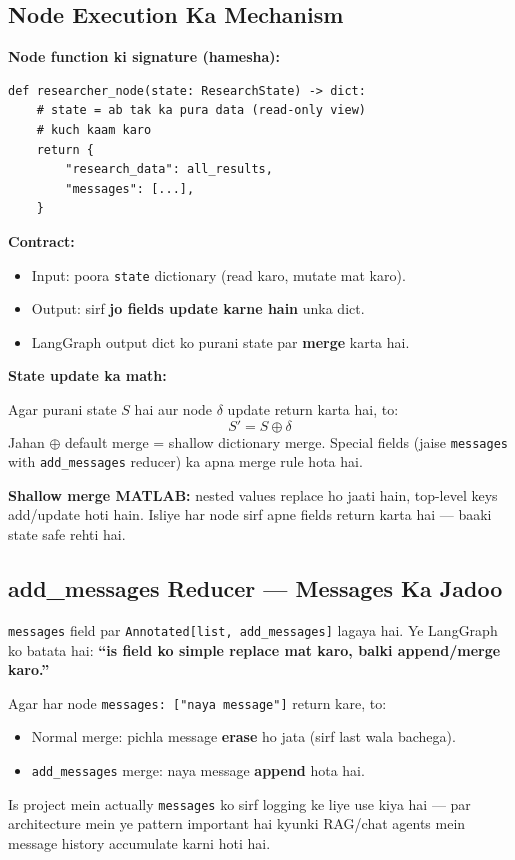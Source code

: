\subsection{Node Execution Ka Mechanism}

\begin{codestorybox}
\textbf{Node function ki signature (hamesha):}

\begin{lstlisting}[style=pythonstyle, caption={Ek node ka contract}]
def researcher_node(state: ResearchState) -> dict:
    # state = ab tak ka pura data (read-only view)
    # kuch kaam karo
    return {
        "research_data": all_results,
        "messages": [...],
    }
\end{lstlisting}

\textbf{Contract:}
\begin{itemize}
\item Input: poora \texttt{state} dictionary (read karo, mutate mat karo).
\item Output: sirf \textbf{jo fields update karne hain} unka dict.
\item LangGraph output dict ko purani state par \textbf{merge} karta hai.
\end{itemize}
\end{codestorybox}

\begin{mathbox}
\textbf{State update ka math:}

Agar purani state $S$ hai aur node $\delta$ update return karta hai, to:
\[
S' = S \oplus \delta
\]
Jahan $\oplus$ default merge = shallow dictionary merge. Special fields (jaise \texttt{messages} with \texttt{add\_messages} reducer) ka apna merge rule hota hai.

\textbf{Shallow merge MATLAB:} nested values replace ho jaati hain, top-level keys add/update hoti hain. Isliye har node sirf apne fields return karta hai --- baaki state safe rehti hai.
\end{mathbox}

\subsection{add\_messages Reducer --- Messages Ka Jadoo}

\begin{conceptbox}
\texttt{messages} field par \texttt{Annotated[list, add\_messages]} lagaya hai. Ye LangGraph ko batata hai: \textbf{``is field ko simple replace mat karo, balki append/merge karo.''}

Agar har node \texttt{messages: ["naya message"]} return kare, to:
\begin{itemize}
\item Normal merge: pichla message \textbf{erase} ho jata (sirf last wala bachega).
\item \texttt{add\_messages} merge: naya message \textbf{append} hota hai.
\end{itemize}

Is project mein actually \texttt{messages} ko sirf logging ke liye use kiya hai --- par architecture mein ye pattern important hai kyunki RAG/chat agents mein message history accumulate karni hoti hai.
\end{conceptbox}

